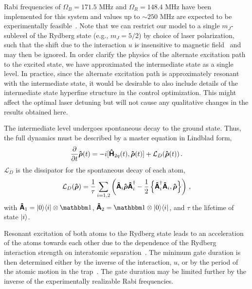 Rabi frequencies of $\Omega_B = 171.5$ MHz
and $\Omega_R = 148.4$ MHz have been implemented for this system and
values up to $\sim 250$ MHz are expected to be experimentally
feasible~\cite{TedRyd}. 
Note that we can restrict our model to a single $m_J$-sublevel of the
Rydberg state (e.g., $m_J=5/2$) by choice of laser polarization, such that
the shift due to the interaction $u$ is insensitive to magnetic field~\cite{SaffmanRMP10}
and may then be ignored.
In order clarify the physics of the alternate excitation path to the excited
state, we have approximated the intermediate state as a single
level. In practice, since the alternate excitation path is
approximately resonant with the intermediate state, it would be desirable to 
also include details of the intermediate state hyperfine
structure in the control optimization. This might affect the optimal
laser detuning but will not cause any qualitative changes in the
results obtained here.

The intermediate level undergoes spontaneous decay to the ground state. Thus,
the full dynamics must be described by a master
equation in Lindblad form,
\begin{equation}
  \label{eq:master}
  \frac{\partial }{\partial t}\Op{\rho}(t)
  = -i[\Op H_{2q}(t),\Op{\rho}(t)] + \mathcal{L}_D(\Op{\rho}(t))\,.
\end{equation}
$\mathcal{L}_D$ is the dissipator for the spontaneous decay of each atom,
\begin{equation}
  \label{eq:dissipator}
  \mathcal L_D(\Op\rho) = \frac{1}{\tau} \sum_{i=1,2} \left(
    \Op{A}_i \Op{\rho} \Op{A}_i^\dagger
    - \frac{1}{2} \left\{\Op{A}_i^\dagger \Op{A}_i, \Op{\rho} \right\}
    \right)\,,
\end{equation}
with $\Op{A}_1 = \Ket{0}\!\Bra{i} \otimes \unity$,
$\Op{A}_2 = \unity \otimes \Ket{0}\!\Bra{i}$, and $\tau$ the lifetime
of state $\Ket{i}$.

Resonant excitation of both atoms to the Rydberg state leads to an
acceleration of the atoms towards each other due to the dependence of the Rydberg
interaction strength on interatomic separation~\cite{JakschPRL00}.
The minimum gate duration
is then determined either by the inverse of the interaction, $u$, or by
the period of the atomic motion in the trap~\cite{GoerzJPB11}.
The gate duration may be limited further by the inverse of the
experimentally realizable Rabi frequencies.

